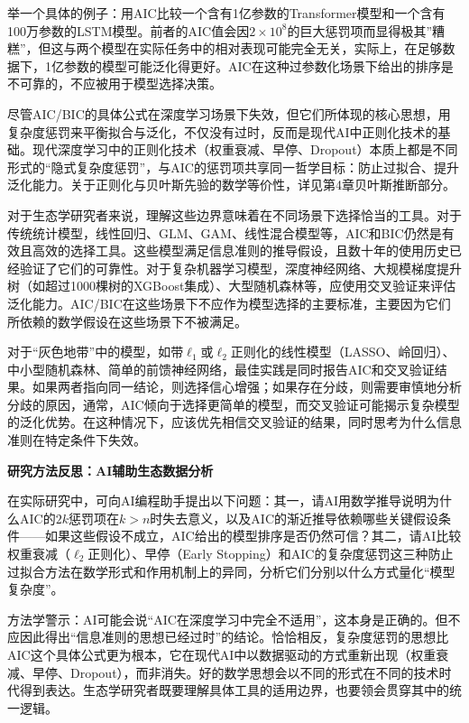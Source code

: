 \documentclass[
  twoside,12pt,fontset=none]{ctexbook}
\renewenvironment{quote}{%
  \def\FrameCommand{{\color{quote-border}\vrule width 4pt}\hspace{10pt}}%
  \MakeFramed {\advance\hsize-\width \FrameRestore\noindent\ignorespaces}%
}{%
  \endMakeFramed
}
\begin{document}
举一个具体的例子：用AIC比较一个含有1亿参数的Transformer模型和一个含有100万参数的LSTM模型。前者的AIC值会因\(2 \times 10^8\)的巨大惩罚项而显得极其''糟糕''，但这与两个模型在实际任务中的相对表现可能完全无关，实际上，在足够数据下，1亿参数的模型可能泛化得更好。AIC在这种过参数化场景下给出的排序是不可靠的，不应被用于模型选择决策。

尽管AIC/BIC的具体公式在深度学习场景下失效，但它们所体现的核心思想，用复杂度惩罚来平衡拟合与泛化，不仅没有过时，反而是现代AI中正则化技术的基础。现代深度学习中的正则化技术（权重衰减、早停、Dropout）本质上都是不同形式的``隐式复杂度惩罚''，与AIC的惩罚项共享同一哲学目标：防止过拟合、提升泛化能力。关于正则化与贝叶斯先验的数学等价性，详见第4章贝叶斯推断部分。

对于生态学研究者来说，理解这些边界意味着在不同场景下选择恰当的工具。对于传统统计模型，线性回归、GLM、GAM、线性混合模型等，AIC和BIC仍然是有效且高效的选择工具。这些模型满足信息准则的推导假设，且数十年的使用历史已经验证了它们的可靠性。对于复杂机器学习模型，深度神经网络、大规模梯度提升树（如超过1000棵树的XGBoost集成）、大型随机森林等，应使用交叉验证来评估泛化能力。AIC/BIC在这些场景下不应作为模型选择的主要标准，主要因为它们所依赖的数学假设在这些场景下不被满足。

对于``灰色地带''中的模型，如带\(\ell_1\)或\(\ell_2\)正则化的线性模型（LASSO、岭回归）、中小型随机森林、简单的前馈神经网络，最佳实践是同时报告AIC和交叉验证结果。如果两者指向同一结论，则选择信心增强；如果存在分歧，则需要审慎地分析分歧的原因，通常，AIC倾向于选择更简单的模型，而交叉验证可能揭示复杂模型的泛化优势。在这种情况下，应该优先相信交叉验证的结果，同时思考为什么信息准则在特定条件下失效。

\begin{quote}
\textbf{研究方法反思：AI辅助生态数据分析}

在实际研究中，可向AI编程助手提出以下问题：其一，请AI用数学推导说明为什么AIC的\(2k\)惩罚项在\(k > n\)时失去意义，以及AIC的渐近推导依赖哪些关键假设条件------如果这些假设不成立，AIC给出的模型排序是否仍然可信？其二，请AI比较权重衰减（\(\ell_2\)正则化）、早停（Early Stopping）和AIC的复杂度惩罚这三种防止过拟合方法在数学形式和作用机制上的异同，分析它们分别以什么方式量化``模型复杂度''。

方法学警示：AI可能会说``AIC在深度学习中完全不适用''，这本身是正确的。但不应因此得出``信息准则的思想已经过时''的结论。恰恰相反，复杂度惩罚的思想比AIC这个具体公式更为根本，它在现代AI中以数据驱动的方式重新出现（权重衰减、早停、Dropout），而非消失。好的数学思想会以不同的形式在不同的技术时代得到表达。生态学研究者既要理解具体工具的适用边界，也要领会贯穿其中的统一逻辑。
\end{quote}
\end{document}
